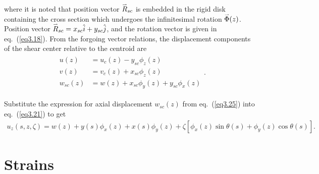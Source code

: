 \documentclass{AeroStructure-ERJohnson}
\def\harp#1{\smash{\mathord{\buildrel{\lower3pt\hbox{$\scriptscriptstyle\rightharpoonup$}}\over{#1}}}}
\begin{document}
\noindent where it is noted that position vector $\harp{R}_{s c}$ is embedded in the rigid disk containing the cross section which undergoes the infinitesimal rotation $\harp{\Phi}(z)$. Position vector $\harp{R}_{s c}=x_{s c} \hat{i}+y_{s c} \hat{j}$, and the rotation vector is given in eq.~(\ref{eq3.18}). From the forgoing vector relations, the displacement components of the shear center relative to the centroid are
\begin{gather}\label{eq3.25}
\begin{split}
u(z)&=u_{c}(z)-y_{s c} \phi_{z}(z) \\
v(z)&=v_{c}(z)+x_{s c} \phi_{z}(z) \\
w_{s c}(z)&=w(z)+x_{s c} \phi_{y}(z)+y_{s c} \phi_{x}(z)
\end{split}.
\end{gather}

\removelastskip

Substitute the expression for axial displacement $w_{s c}(z)$ from eq.~(\ref{eq3.25}) into eq.~(\ref{eq3.21}) to get
\begin{align}\label{eq3.26}
u_{z}(s, z, \zeta)=w(z)+y(s) \phi_{x}(z)+x(s) \phi_{y}(z)+\zeta\left[\phi_{x}(z) \sin \theta(s)+\phi_{y}(z) \cos \theta(s)\right].
\end{align}

\clearpage

\section{Strains}\label{sec3.4}\enlargethispage{-1\baselineskip}
\end{document}
